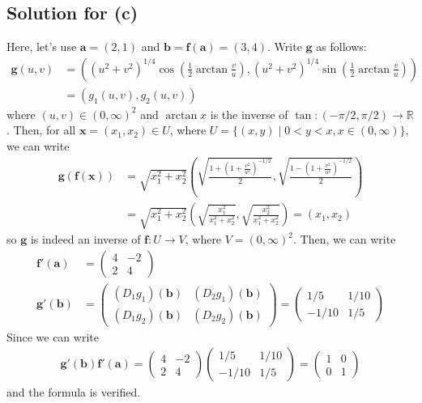 \documentclass{scrartcl}
\begin{document}
\subsection{Solution for (c)}
Here, let's use \(\mathbf{a} = (2, 1)\) and \(\mathbf{b} =
\mathbf{f}(\mathbf{a}) = (3, 4)\). Write \(\mathbf{g}\) as follows:
\begin{align*}
  \mathbf{g}(u, v)
  &= \left( (u^2 + v^2)^{1/4}
    \cos \left( \frac{1}{2} \arctan \frac{v}{u} \right),
    (u^2 + v^2)^{1/4}
    \sin \left( \frac{1}{2} \arctan \frac{v}{u} \right) \right) \\
  &= (g_1(u, v), g_2(u, v))
\end{align*}
where \((u, v) \in (0, \infty)^2\) and \(\arctan x\) is the inverse of \(\tan:
(-\pi / 2, \pi / 2) \to \mathbb{R}\). Then, for all \(\mathbf{x} = (x_1, x_2)
\in U\), where \(U = \{(x, y)\; |\; 0 < y < x, x \in (0, \infty)\}\), we can
write
\begin{align*}
  \mathbf{g}(\mathbf{f}(\mathbf{x}))
  &= \sqrt{x^2_1 + x^2_2}
    \left(
      \sqrt{\frac{1 + \left( 1 + \frac{v^2}{u^2} \right)^{-1/2}}{2}},
      \sqrt{\frac{1 - \left( 1 + \frac{v^2}{u^2} \right)^{-1/2}}{2}}
    \right) \\
  &= \sqrt{x^2_1 + x^2_2}
    \left(
      \sqrt{\frac{x^2_1}{x^2_1 + x^2_2}},
      \sqrt{\frac{x^2_2}{x^2_1 + x^2_2}}
    \right)
  = (x_1, x_2)
\end{align*}
so \(\mathbf{g}\) is indeed an inverse of \(\mathbf{f}: U \to V\), where \(V =
(0, \infty)^2\). Then, we can write
\begin{align*}
  \mathbf{f}'(\mathbf{a})
  &= \begin{pmatrix}
    4 & -2 \\
    2 & 4
  \end{pmatrix} \\
  \mathbf{g}'(\mathbf{b})
  &= \begin{pmatrix}
    (D_1 g_1) (\mathbf{b}) & (D_2 g_1) (\mathbf{b}) \\
    (D_1 g_2) (\mathbf{b}) & (D_2 g_2) (\mathbf{b})
  \end{pmatrix}
  = \begin{pmatrix}
    1/5 & 1/10 \\
    -1/10 & 1/5
  \end{pmatrix}
\end{align*}
Since we can write
\begin{align*}
  \mathbf{g}'(\mathbf{b}) \mathbf{f}'(\mathbf{a})
  = \begin{pmatrix}
    4 & -2 \\
    2 & 4
  \end{pmatrix} \begin{pmatrix}
    1/5 & 1/10 \\
    -1/10 & 1/5
  \end{pmatrix}
  = \begin{pmatrix}
    1 & 0 \\
    0 & 1
  \end{pmatrix}
\end{align*}
and the formula is verified.
\end{document}
